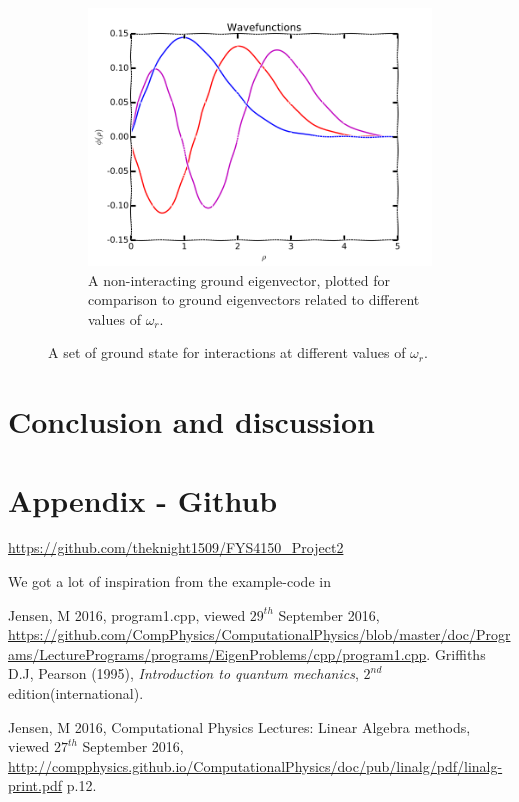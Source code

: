 \documentclass[11pt,a4paper,notitlepage]{article}
\begin{document}
\begin{figure}[H]
    \begin{subfigure}[t]{0.45\textwidth}
        \includegraphics[scale=0.40]{../eigvecs_vs_each_other.png}
        \caption{A non-interacting ground eigenvector, plotted for comparison to ground eigenvectors related to different values of $\omega_r$.}\label{fig:ground-eigvecs-compare}
    \end{subfigure}
    \caption{A set of ground state for interactions at different values of $\omega_r$.}\label{fig:eigvecs-interact}
\end{figure}


\section{Conclusion and discussion}
\section{Appendix - Github} \label{section:github}
\url{https://github.com/theknight1509/FYS4150_Project2}


We got a lot of inspiration from the example-code in \cite[web-site]{example_code}



\begin{thebibliography}{9}
  Jensen, M 2016,
  program1.cpp,
  viewed $29^{th}$ September 2016,
  \url{https://github.com/CompPhysics/ComputationalPhysics/blob/master/doc/Programs/LecturePrograms/programs/EigenProblems/cpp/program1.cpp}.
  Griffiths D.J, 
  Pearson (1995),
  \emph{Introduction to quantum mechanics},
  $2^{nd}$ edition(international).
  
	Jensen, M 2016, 
	Computational Physics Lectures: Linear
Algebra methods, 
	viewed $27^{th}$ September 2016, 
	\url{http://compphysics.github.io/ComputationalPhysics/doc/pub/linalg/pdf/linalg-print.pdf} p.12. 

\end{thebibliography}
\end{document}
